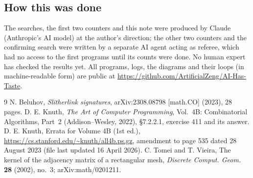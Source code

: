 \documentclass[11pt]{amsart}
\theoremstyle{remark}
\begin{document}
\subsection*{How this was done}
The searches, the first two counters and this note were produced by Claude (Anthropic's AI model) at the author's
direction; the other two counters and the confirming search were written by a separate AI agent acting as referee,
which had no access to the first programs until its counts were done. No human expert has checked the results yet.
All programs, logs, the diagrams and their loops (in machine-readable form) are public at
\url{https://github.com/ArtificialZeng/AI-Has-Taste}.

\begin{thebibliography}{9}
 N. Beluhov, \emph{Slitherlink signatures}, arXiv:2308.08798 [math.CO] (2023), 28 pages.
 D. E. Knuth, \emph{The Art of Computer Programming}, Vol.~4B: Combinatorial Algorithms, Part~2
(Addison--Wesley, 2022), \S7.2.2.1, exercise 411 and its answer.
 D. E. Knuth, Errata for Volume 4B (1st ed.), \url{https://cs.stanford.edu/~knuth/all4b.ps.gz},
amendment to page 535 dated 28 August 2023 (file last updated 16 April 2026).
 C. Tomei and T. Vieira, The kernel of the adjacency matrix of a rectangular mesh, \emph{Discrete
Comput. Geom.} \textbf{28} (2002), no.~3; arXiv:math/0201211.
\end{thebibliography}
\end{document}

